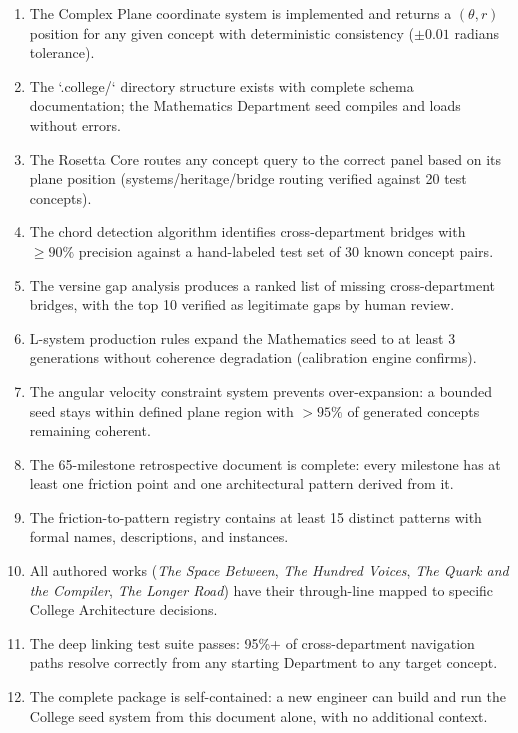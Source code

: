\documentclass[11pt,letterpaper]{article}
\begin{document}
\begin{enumerate}
  \item The Complex Plane coordinate system is implemented and returns a $(θ, r)$ position for any
  given concept with deterministic consistency ($\pm 0.01$ radians tolerance).

  \item The `.college/` directory structure exists with complete schema documentation; the Mathematics
  Department seed compiles and loads without errors.

  \item The Rosetta Core routes any concept query to the correct panel based on its plane position
  (systems/heritage/bridge routing verified against 20 test concepts).

  \item The chord detection algorithm identifies cross-department bridges with $\geq 90\%$ precision
  against a hand-labeled test set of 30 known concept pairs.

  \item The versine gap analysis produces a ranked list of missing cross-department bridges, with
  the top 10 verified as legitimate gaps by human review.

  \item L-system production rules expand the Mathematics seed to at least 3 generations without
  coherence degradation (calibration engine confirms).

  \item The angular velocity constraint system prevents over-expansion: a bounded seed stays within
  defined plane region with $> 95\%$ of generated concepts remaining coherent.

  \item The 65-milestone retrospective document is complete: every milestone has at least one
  friction point and one architectural pattern derived from it.

  \item The friction-to-pattern registry contains at least 15 distinct patterns with formal names,
  descriptions, and instances.

  \item All authored works (\textit{The Space Between}, \textit{The Hundred Voices}, \textit{The
  Quark and the Compiler}, \textit{The Longer Road}) have their through-line mapped to specific
  College Architecture decisions.

  \item The deep linking test suite passes: 95\%+ of cross-department navigation paths resolve
  correctly from any starting Department to any target concept.

  \item The complete package is self-contained: a new engineer can build and run the College seed
  system from this document alone, with no additional context.
\end{enumerate}
\end{document}
